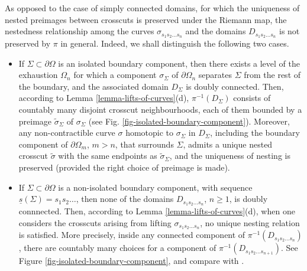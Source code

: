 \documentclass[11pt,a4paper,reqno]{amsart}
\theoremstyle{plain}
\theoremstyle{definition}
\theoremstyle{plain}
\renewcommand{\tilde}{\widetilde}
\begin{document}
As opposed to the case of simply connected domains, for which the uniqueness of nested preimages between crosscuts is preserved under the Riemann map, the nestedness relationship among the curves $ \sigma_{s_1s_2\dots s_n}  $ and the domains $ D_{s_1s_2\dots s_n}  $  is not preserved by $ \pi $ in general. Indeed, we shall distinguish the following two cases.
\begin{itemize}
	\item If $ \Sigma \subset\partial\Omega$ is an isolated boundary component, then there exists a level of the exhaustion $ \Omega_n $ for which a component $ \sigma_\Sigma$ of $\partial \Omega_n $ separates $ \Sigma $ from the rest of the boundary, and the associated domain $ D_\Sigma $ is doubly connected. Then, according to Lemma \ref{lemma-lifts-of-curves}(d), $ \pi^{-1}(D_\Sigma) $ consists of countably many disjoint crosscut neighbourhoods, each of them bounded by a preimage $\tilde\sigma_\Sigma$ of $ \sigma_\Sigma $ (see Fig. \ref{fig-isolated-boundary-component}). Moreover, any non-contractible curve $\sigma$ homotopic to $ \sigma_\Sigma  $ in $ D_\Sigma $, including the boundary component of $\partial\Omega_m$, $m > n$, that surrounds $\Sigma$, admits a unique nested crosscut $\tilde\sigma$ with the same endpoints as $\tilde\sigma_\Sigma$, and the uniqueness of nesting is preserved (provided the right choice of preimage is made).



	\item  If $ \Sigma \subset\partial\Omega$ is a non-isolated boundary component, with sequence $ \underline{s}(\Sigma)=s_1s_2\dots $, then none of the domains $ D_{s_1s_2\dots s_n} $, $ n\geq 1 $, is doubly connnected. Then, according to Lemma \ref{lemma-lifts-of-curves}(d), when one considers the crosscuts arising from lifting $ \sigma_{s_1s_2\dots s_n} $, no unique nesting relation is satisfied. More precisely, inside any connected component of $ \pi^{-1}(D_{s_1s_2\dots s_n} ) $, there are countably many choices for a component of  $ \pi^{-1}(D_{s_1s_2\dots s_{n+1}} ) $. See Figure \ref{fig-isolated-boundary-component}, and compare with \cite[Sect. 4]{Oht54}.
\end{itemize}
\end{document}
